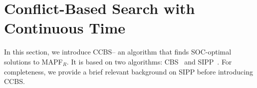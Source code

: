 \documentclass[review]{elsarticle}
\newcommand\konstantin[1]{\nb{\textbf{Konstantin:}}{red}{#1}}
\newcommand\roni[1]{\nb{\textbf{Roni:}}{green}{#1}}
\newcommand{\ccbs}{\ac{CCBS}\xspace}
\newcommand{\cbs}{\ac{CBS}\xspace}
\newcommand{\sipp}{\ac{SIPP}\xspace}
\newcommand{\mapfr}{\ac{MAPF}$_R$\xspace}
\begin{document}





\section{Conflict-Based Search with Continuous Time}

In this section, we introduce \ccbs -- an algorithm that finds SOC-optimal solutions to  \mapfr. 
It is based on two algorithms: \cbs~\cite{sharon2015conflict} and \sipp~\cite{phillips2011sipp}. 
For completeness, we provide a brief relevant background on \sipp before introducing \ccbs. 
\end{document}
